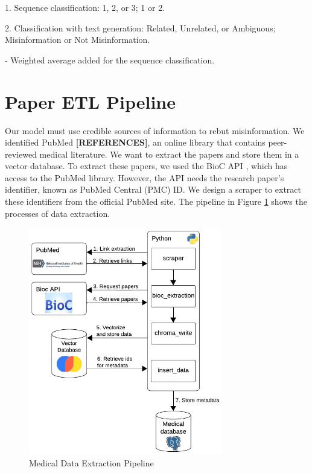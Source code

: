     1. Sequence classification: 1, 2, or 3; 1 or 2.

    2. Classification with text generation: Related, Unrelated, or Ambiguous; Misinformation or Not Misinformation.

- Weighted average added for the sequence classification.


\section{Paper ETL Pipeline}

Our model must use credible sources of information to rebut misinformation. We identified PubMed \textbf{[REFERENCES]}, an online library that contains peer-reviewed medical literature. We want to extract the papers and store them in a vector database. To extract these papers, we used the BioC API \cite{bioinformatics}, which has access to the PubMed library. However, the API needs the research paper's identifier, known as PubMed Central (PMC) ID. We design a scraper to extract these identifiers from the official PubMed site. The pipeline in Figure \ref{fig:etl} shows the processes of data extraction. 

\begin{figure}[!ht]
	\begin{center}
		\includegraphics[width=0.75\textwidth]{images/ETL_Pipeline.png} %
	\end{center}
	\caption{Medical Data Extraction Pipeline} %
	\label{fig:etl}
\end{figure}

